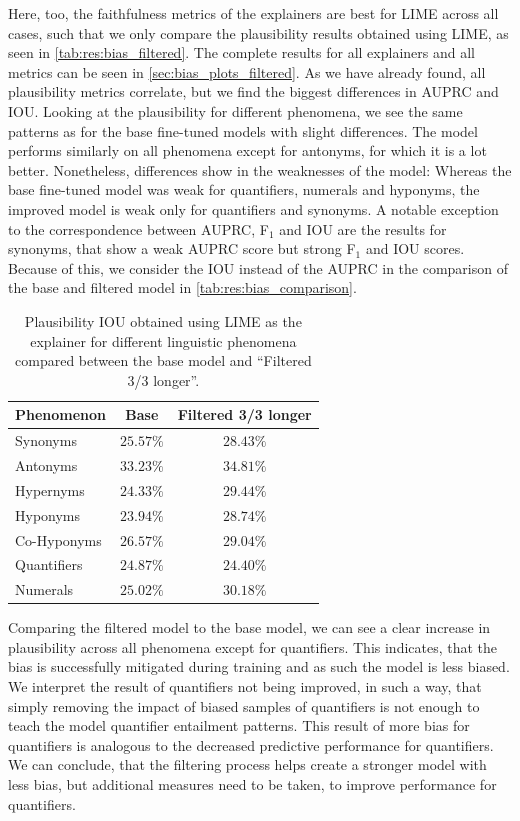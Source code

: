 Here, too, the faithfulness metrics of the explainers are best for \ac{LIME} across all cases, such that we only compare the plausibility results obtained using \ac{LIME}, as seen in \autoref{tab:res:bias_filtered}. The complete results for all explainers and all metrics can be seen in \autoref{sec:bias_plots_filtered}. As we have already found, all plausibility metrics correlate, but we find the biggest differences in \acs{AUPRC} and \acs{IOU}. Looking at the plausibility for different phenomena, we see the same patterns as for the base fine-tuned models with slight differences. The model performs similarly on all phenomena except for antonyms, for which it is a lot better. Nonetheless, differences show in the weaknesses of the model: Whereas the base fine-tuned model was weak for quantifiers, numerals and hyponyms, the improved model is weak only for quantifiers and synonyms. A notable exception to the correspondence between \acs{AUPRC}, F$_1$ and \acs{IOU} are the results for synonyms, that show a weak \acs{AUPRC} score but strong F$_1$ and \acs{IOU} scores. Because of this, we consider the \acs{IOU} instead of the \acs{AUPRC} in the comparison of the base and filtered model in \autoref{tab:res:bias_comparison}.

\begin{table}[ht!]
    \centering
    \caption{Plausibility \acs{IOU} obtained using \ac{LIME} as the explainer for different linguistic phenomena compared between the base model and \enquote{Filtered 3/3 longer}.}
    \begin{tabular}{l c c}
        \toprule
        \multicolumn{1}{c}{Phenomenon} & Base & Filtered 3/3 longer \\
        \midrule
        Synonyms & $25.57\%$ & $28.43\%$ \\
        Antonyms & $33.23\%$ & $34.81\%$ \\
        Hypernyms & $24.33\%$ & $29.44\%$ \\
        Hyponyms & $23.94\%$ & $28.74\%$ \\
        Co-Hyponyms & $26.57\%$ & $29.04\%$ \\
        Quantifiers & $24.87\%$ & $24.40\%$ \\
        Numerals & $25.02\%$ & $30.18\%$ \\
        \bottomrule
    \end{tabular}
    \label{tab:res:bias_comparison}
\end{table}

Comparing the filtered model to the base model, we can see a clear increase in plausibility across all phenomena except for quantifiers. This indicates, that the bias is successfully mitigated during training and as such the model is less biased. We interpret the result of quantifiers not being improved, in such a way, that simply removing the impact of biased samples of quantifiers is not enough to teach the model quantifier entailment patterns. This result of more bias for quantifiers is analogous to the decreased predictive performance for quantifiers. We can conclude, that the filtering process helps create a stronger model with less bias, but additional measures need to be taken, to improve performance for quantifiers.

